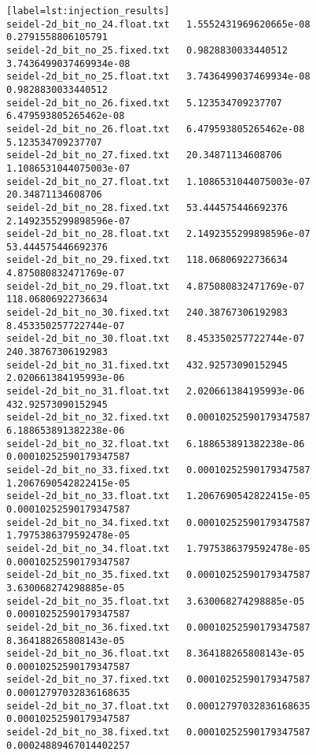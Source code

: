 \begin{verbatim}[label=lst:injection_results]
seidel-2d_bit_no_24.float.txt   1.5552431969620665e-08                  0.2791558806105791
seidel-2d_bit_no_25.fixed.txt   0.9828830033440512                      3.7436499037469934e-08
seidel-2d_bit_no_25.float.txt   3.7436499037469934e-08                  0.9828830033440512
seidel-2d_bit_no_26.fixed.txt   5.123534709237707                       6.479593805265462e-08
seidel-2d_bit_no_26.float.txt   6.479593805265462e-08                   5.123534709237707
seidel-2d_bit_no_27.fixed.txt   20.34871134608706                       1.1086531044075003e-07
seidel-2d_bit_no_27.float.txt   1.1086531044075003e-07                  20.34871134608706
seidel-2d_bit_no_28.fixed.txt   53.444575446692376                      2.1492355299898596e-07
seidel-2d_bit_no_28.float.txt   2.1492355299898596e-07                  53.444575446692376
seidel-2d_bit_no_29.fixed.txt   118.06806922736634                      4.875080832471769e-07
seidel-2d_bit_no_29.float.txt   4.875080832471769e-07                   118.06806922736634
seidel-2d_bit_no_30.fixed.txt   240.38767306192983                      8.453350257722744e-07
seidel-2d_bit_no_30.float.txt   8.453350257722744e-07                   240.38767306192983
seidel-2d_bit_no_31.fixed.txt   432.92573090152945                      2.020661384195993e-06
seidel-2d_bit_no_31.float.txt   2.020661384195993e-06                   432.92573090152945
seidel-2d_bit_no_32.fixed.txt   0.00010252590179347587                  6.188653891382238e-06
seidel-2d_bit_no_32.float.txt   6.188653891382238e-06                   0.00010252590179347587
seidel-2d_bit_no_33.fixed.txt   0.00010252590179347587                  1.2067690542822415e-05
seidel-2d_bit_no_33.float.txt   1.2067690542822415e-05                  0.00010252590179347587
seidel-2d_bit_no_34.fixed.txt   0.00010252590179347587                  1.7975386379592478e-05
seidel-2d_bit_no_34.float.txt   1.7975386379592478e-05                  0.00010252590179347587
seidel-2d_bit_no_35.fixed.txt   0.00010252590179347587                  3.630068274298885e-05
seidel-2d_bit_no_35.float.txt   3.630068274298885e-05                   0.00010252590179347587
seidel-2d_bit_no_36.fixed.txt   0.00010252590179347587                  8.364188265808143e-05
seidel-2d_bit_no_36.float.txt   8.364188265808143e-05                   0.00010252590179347587
seidel-2d_bit_no_37.fixed.txt   0.00010252590179347587                  0.00012797032836168635
seidel-2d_bit_no_37.float.txt   0.00012797032836168635                  0.00010252590179347587
seidel-2d_bit_no_38.fixed.txt   0.00010252590179347587                  0.00024889467014402257

\end{verbatim}
